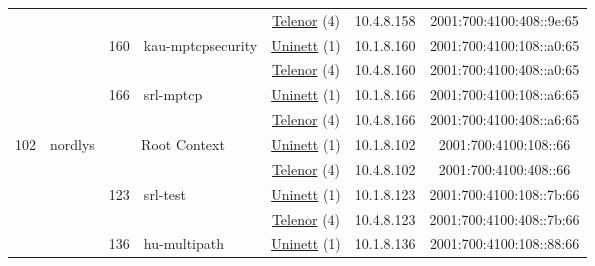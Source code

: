 \begin{small}
\begin{center}
\begin{longtable}{|c|c|c|c|c|c|c|c|}
  &  &  &  & \multicolumn{2}{|c|}{\tiny{\href{https://www.telenor.no}{Telenor} (4)}} & \tiny{10.4.8.158} & \tiny{2001:700:4100:408::9e:65} \\* \cline{3-3}\cline{4-4}\cline{5-5}\cline{6-6}\cline{7-7}\cline{8-8}
  &  & \multirow{2}{*}{\tiny{160}} & \multicolumn{1}{|l|}{\multirow{2}{*}{\tiny{kau-mptcpsecurity}}} & \multicolumn{2}{|c|}{\tiny{\href{https://www.uninett.no}{Uninett} (1)}} & \tiny{10.1.8.160} & \tiny{2001:700:4100:108::a0:65} \\* \cline{5-5}\cline{6-6}\cline{7-7}\cline{8-8}
  &  &  &  & \multicolumn{2}{|c|}{\tiny{\href{https://www.telenor.no}{Telenor} (4)}} & \tiny{10.4.8.160} & \tiny{2001:700:4100:408::a0:65} \\* \cline{3-3}\cline{4-4}\cline{5-5}\cline{6-6}\cline{7-7}\cline{8-8}
  &  & \multirow{2}{*}{\tiny{166}} & \multicolumn{1}{|l|}{\multirow{2}{*}{\tiny{srl-mptcp}}} & \multicolumn{2}{|c|}{\tiny{\href{https://www.uninett.no}{Uninett} (1)}} & \tiny{10.1.8.166} & \tiny{2001:700:4100:108::a6:65} \\* \cline{5-5}\cline{6-6}\cline{7-7}\cline{8-8}
  &  &  &  & \multicolumn{2}{|c|}{\tiny{\href{https://www.telenor.no}{Telenor} (4)}} & \tiny{10.4.8.166} & \tiny{2001:700:4100:408::a6:65} \\ \hline
 \multirow{16}{*}{\tiny{102}} & \multicolumn{1}{|l|}{\multirow{16}{*}{\tiny{nordlys}}} & \multicolumn{2}{|c|}{\multirow{2}{*}{\tiny{Root Context}}} & \multicolumn{2}{|c|}{\tiny{\href{https://www.uninett.no}{Uninett} (1)}} & \tiny{10.1.8.102} & \tiny{2001:700:4100:108::66} \\* \cline{5-5}\cline{6-6}\cline{7-7}\cline{8-8}
  &  & \multicolumn{2}{|c|}{} & \multicolumn{2}{|c|}{\tiny{\href{https://www.telenor.no}{Telenor} (4)}} & \tiny{10.4.8.102} & \tiny{2001:700:4100:408::66} \\* \cline{3-3}\cline{4-4}\cline{5-5}\cline{6-6}\cline{7-7}\cline{8-8}
  &  & \multirow{2}{*}{\tiny{123}} & \multicolumn{1}{|l|}{\multirow{2}{*}{\tiny{srl-test}}} & \multicolumn{2}{|c|}{\tiny{\href{https://www.uninett.no}{Uninett} (1)}} & \tiny{10.1.8.123} & \tiny{2001:700:4100:108::7b:66} \\* \cline{5-5}\cline{6-6}\cline{7-7}\cline{8-8}
  &  &  &  & \multicolumn{2}{|c|}{\tiny{\href{https://www.telenor.no}{Telenor} (4)}} & \tiny{10.4.8.123} & \tiny{2001:700:4100:408::7b:66} \\* \cline{3-3}\cline{4-4}\cline{5-5}\cline{6-6}\cline{7-7}\cline{8-8}
  &  & \multirow{2}{*}{\tiny{136}} & \multicolumn{1}{|l|}{\multirow{2}{*}{\tiny{hu-multipath}}} & \multicolumn{2}{|c|}{\tiny{\href{https://www.uninett.no}{Uninett} (1)}} & \tiny{10.1.8.136} & \tiny{2001:700:4100:108::88:66} \\* \cline{5-5}\cline{6-6}\cline{7-7}\cline{8-8}

\end{longtable}
\end{center}
\end{small}
